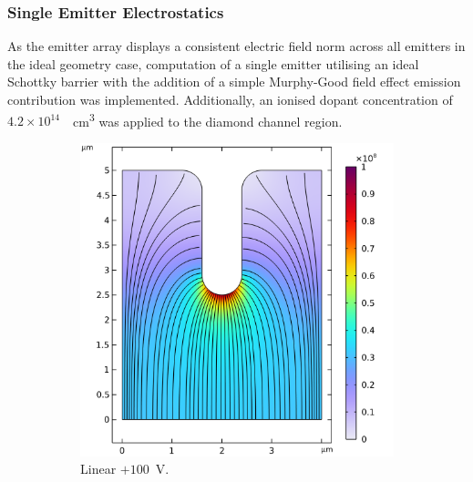 \begin{refsection}
\subsubsection{Single Emitter Electrostatics}
As the emitter array displays a consistent electric field norm across all emitters in the ideal geometry case, computation of a single emitter utilising an ideal Schottky barrier with the addition of a simple Murphy-Good field effect emission contribution was implemented. Additionally, an ionised dopant concentration of $4.2\times10^{14}$~\si{\per\centi\metre\cubed} was applied to the diamond channel region.

\begin{figure}[H]
    \centering
    \begin{subfigure}[b]{0.45\linewidth}
        \includegraphics[width=\linewidth]{Chapter7/Figs/Raster/Comsol/+100_normE_smol.png}
        \caption{Linear $+100$~\si{\volt}.}
        \label{fig:c_+100_lin_norme}
    \end{subfigure}
    \hfill %
    \begin{subfigure}[b]{0.45\linewidth}

\end{subfigure}
\end{figure}
\end{refsection}
